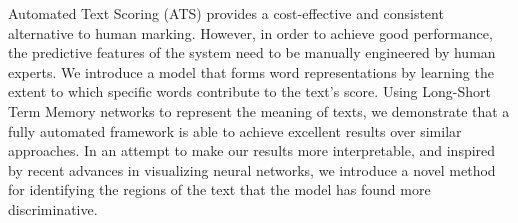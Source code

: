 Automated Text Scoring (ATS) provides a cost-effective and consistent alternative to human marking. However, in order to achieve good performance, the predictive features of the system need to be manually engineered by human experts. We introduce a model that forms word representations by learning the extent to which specific words contribute to the text's score.              Using Long-Short Term Memory networks to represent the meaning of texts, we demonstrate that a fully automated framework is able to achieve excellent results over similar approaches. In an attempt to make our results more interpretable, and inspired by recent advances in visualizing neural networks, we introduce a novel method for identifying the regions of the text that the model has found more discriminative.
